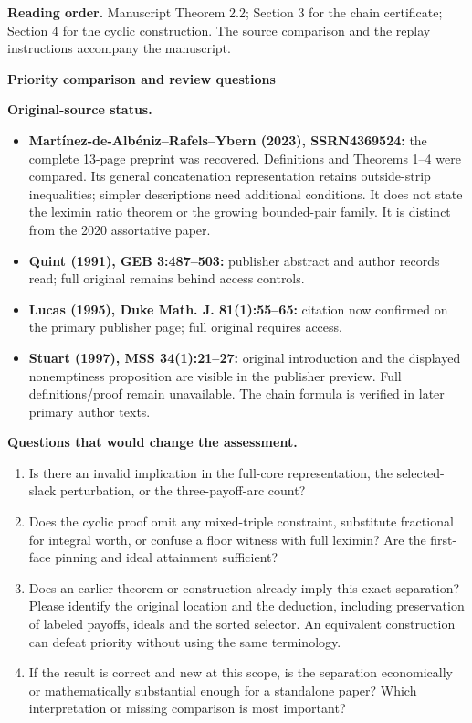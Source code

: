 \documentclass[11pt]{article}
\begin{document}
\textbf{Reading order.} Manuscript Theorem 2.2; Section 3 for the chain
certificate; Section 4 for the cyclic construction. The source comparison
and the replay instructions accompany the manuscript.

\newpage
\begin{center}{\Large\bfseries Priority comparison and review questions}\end{center}

\textbf{Original-source status.}
\begin{itemize}
\item \textbf{Mart\'inez-de-Alb\'eniz--Rafels--Ybern (2023), SSRN4369524:}
the complete 13-page preprint was recovered. Definitions and Theorems
1--4 were compared. Its general concatenation representation retains
outside-strip inequalities; simpler descriptions need additional
conditions. It does not state the leximin ratio theorem or the growing
bounded-pair family. It is distinct from the 2020 assortative paper.
\item \textbf{Quint (1991), GEB 3:487--503:} publisher abstract and author
records read; full original remains behind access controls.
\item \textbf{Lucas (1995), Duke Math. J. 81(1):55--65:} citation now
confirmed on the primary publisher page; full original requires access.
\item \textbf{Stuart (1997), MSS 34(1):21--27:} original introduction and
the displayed nonemptiness proposition are visible in the publisher
preview. Full definitions/proof remain unavailable. The chain formula
is verified in later primary author texts.
\end{itemize}

\textbf{Questions that would change the assessment.}
\begin{enumerate}
\item Is there an invalid implication in the full-core representation,
the selected-slack perturbation, or the three-payoff-arc count?
\item Does the cyclic proof omit any mixed-triple constraint, substitute
fractional for integral worth, or confuse a floor witness with full
leximin? Are the first-face pinning and ideal attainment sufficient?
\item Does an earlier theorem or construction already imply this exact
separation? Please identify the original location and the deduction,
including preservation of labeled payoffs, ideals and the sorted
selector. An equivalent construction can defeat priority without using
the same terminology.
\item If the result is correct and new at this scope, is the separation
economically or mathematically substantial enough for a standalone
paper? Which interpretation or missing comparison is most important?
\end{enumerate}
\end{document}
